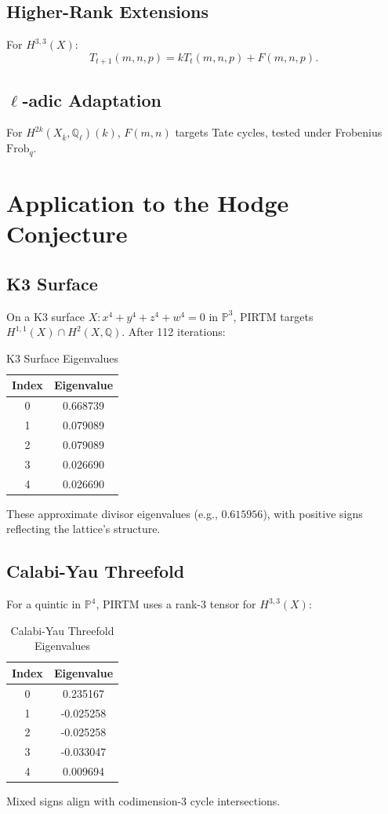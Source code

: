 \documentclass[11pt]{article}
\theoremstyle{plain}
\begin{document}
\subsection{Higher-Rank Extensions}
For \(H^{3,3}(X)\):
\begin{equation}
T_{t+1}(m,n,p) = k T_t(m,n,p) + F(m,n,p).
\end{equation}

\subsection{\(\ell\)-adic Adaptation}
For \(H^{2k}(X_{\overline{k}}, \mathbb{Q}_\ell)(k)\), \(F(m,n)\) targets Tate cycles, tested under Frobenius \(\text{Frob}_q\).

\section{Application to the Hodge Conjecture}

\subsection{K3 Surface}
On a K3 surface \(X: x^4 + y^4 + z^4 + w^4 = 0\) in \(\mathbb{P}^3\), PIRTM targets \(H^{1,1}(X) \cap H^2(X, \mathbb{Q})\). After 112 iterations:
\begin{table}[h]
\centering
\begin{tabular}{cc}
\toprule
Index & Eigenvalue \\
\midrule
0 & 0.668739 \\
1 & 0.079089 \\
2 & 0.079089 \\
3 & 0.026690 \\
4 & 0.026690 \\
\bottomrule
\end{tabular}
\caption{K3 Surface Eigenvalues}
\end{table}
These approximate divisor eigenvalues (e.g., \(0.615956\)), with positive signs reflecting the lattice’s structure.

\subsection{Calabi-Yau Threefold}
For a quintic in \(\mathbb{P}^4\), PIRTM uses a rank-3 tensor for \(H^{3,3}(X)\):
\begin{table}[h]
\centering
\begin{tabular}{cc}
\toprule
Index & Eigenvalue \\
\midrule
0 & 0.235167 \\
1 & -0.025258 \\
2 & -0.025258 \\
3 & -0.033047 \\
4 & 0.009694 \\
\bottomrule
\end{tabular}
\caption{Calabi-Yau Threefold Eigenvalues}
\end{table}
Mixed signs align with codimension-3 cycle intersections.
\end{document}
